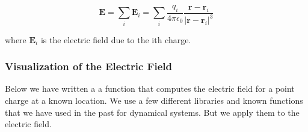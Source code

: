 \[\mathbf{E} = \sum_i \mathbf{E}_i = \sum_i \dfrac{q_i}{4\pi\epsilon_0} \dfrac{\mathbf{r} - \mathbf{r}_i}{\left|\mathbf{r} - \mathbf{r}_i\right|^3}\]

where \(\mathbf{E}_i\) is the electric field due to the ith charge.

\subsubsection{Visualization of the Electric
Field}\label{visualization-of-the-electric-field}

Below we have written a a function that computes the electric field for
a point charge at a known location. We use a few different libraries and
known functions that we have used in the past for dynamical systems. But
we apply them to the electric field.

